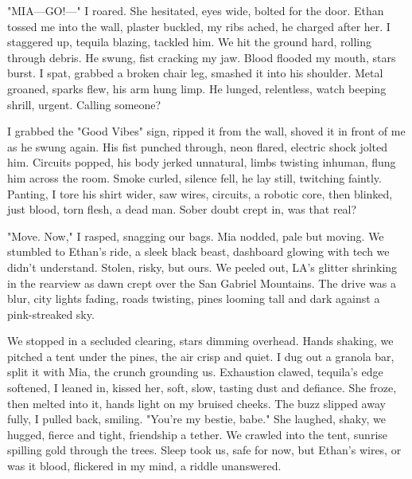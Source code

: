 \documentclass{article}
\begin{document}
"MIA—GO!—" I roared. She hesitated, eyes wide, bolted for the door. Ethan tossed me into the wall, plaster buckled, my ribs ached, he charged after her. I staggered up, tequila blazing, tackled him. We hit the ground hard, rolling through debris. He swung, fist cracking my jaw. Blood flooded my mouth, stars burst. I spat, grabbed a broken chair leg, smashed it into his shoulder. Metal groaned, sparks flew, his arm hung limp. He lunged, relentless, watch beeping shrill, urgent. Calling someone?

I grabbed the "Good Vibes" sign, ripped it from the wall, shoved it in front of me as he swung again. His fist punched through, neon flared, electric shock jolted him. Circuits popped, his body jerked unnatural, limbs twisting inhuman, flung him across the room. Smoke curled, silence fell, he lay still, twitching faintly. Panting, I tore his shirt wider, saw wires, circuits, a robotic core, then blinked, just blood, torn flesh, a dead man. Sober doubt crept in, was that real?

"Move. Now," I rasped, snagging our bags. Mia nodded, pale but moving. We stumbled to Ethan's ride, a sleek black beast, dashboard glowing with tech we didn't understand. Stolen, risky, but ours. We peeled out, LA's glitter shrinking in the rearview as dawn crept over the San Gabriel Mountains. The drive was a blur, city lights fading, roads twisting, pines looming tall and dark against a pink-streaked sky.

We stopped in a secluded clearing, stars dimming overhead. Hands shaking, we pitched a tent under the pines, the air crisp and quiet. I dug out a granola bar, split it with Mia, the crunch grounding us. Exhaustion clawed, tequila's edge softened, I leaned in, kissed her, soft, slow, tasting dust and defiance. She froze, then melted into it, hands light on my bruised cheeks. The buzz slipped away fully, I pulled back, smiling. "You're my bestie, babe." She laughed, shaky, we hugged, fierce and tight, friendship a tether. We crawled into the tent, sunrise spilling gold through the trees. Sleep took us, safe for now, but Ethan's wires, or was it blood, flickered in my mind, a riddle unanswered.
\end{document}
